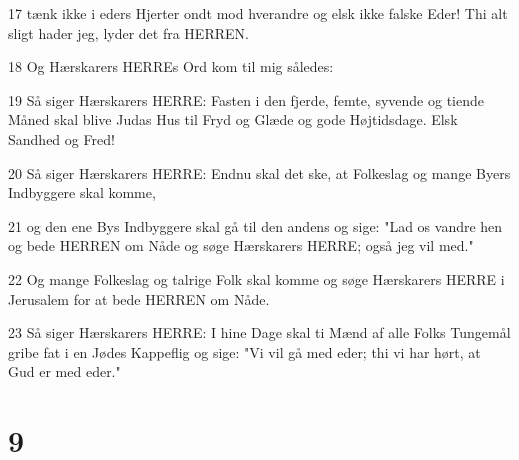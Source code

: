 \par 17 tænk ikke i eders Hjerter ondt mod hverandre og elsk ikke falske Eder! Thi alt sligt hader jeg, lyder det fra HERREN.
\par 18 Og Hærskarers HERREs Ord kom til mig således:
\par 19 Så siger Hærskarers HERRE: Fasten i den fjerde, femte, syvende og tiende Måned skal blive Judas Hus til Fryd og Glæde og gode Højtidsdage. Elsk Sandhed og Fred!
\par 20 Så siger Hærskarers HERRE: Endnu skal det ske, at Folkeslag og mange Byers Indbyggere skal komme,
\par 21 og den ene Bys Indbyggere skal gå til den andens og sige: "Lad os vandre hen og bede HERREN om Nåde og søge Hærskarers HERRE; også jeg vil med."
\par 22 Og mange Folkeslag og talrige Folk skal komme og søge Hærskarers HERRE i Jerusalem for at bede HERREN om Nåde.
\par 23 Så siger Hærskarers HERRE: I hine Dage skal ti Mænd af alle Folks Tungemål gribe fat i en Jødes Kappeflig og sige: "Vi vil gå med eder; thi vi har hørt, at Gud er med eder."

\chapter{9}

